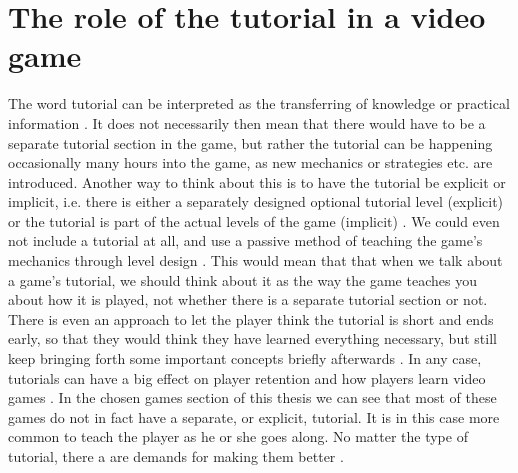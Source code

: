 \section{The role of the tutorial in a video game}

The word tutorial can be interpreted as the transferring of knowledge or practical information \cite{tutorial}. It does not necessarily then mean that there would have to be a separate tutorial section in the game, but rather the tutorial can be happening occasionally many hours into the game, as new mechanics or strategies etc. are introduced. Another way to think about this is to have the tutorial be explicit or implicit, i.e. there is either a separately designed optional tutorial level (explicit) or the tutorial is part of the actual levels of the game (implicit) \cite{Adams2013}. We could even not include a tutorial at all, and use a passive method of teaching the game's mechanics through level design \cite{Moss2017}. This would mean that that when we talk about a game's tutorial, we should think about it as the way the game teaches you about how it is played, not whether there is a separate tutorial section or not. There is even an approach to let the player think the tutorial is short and ends early, so that they would think they have learned everything necessary, but still keep bringing forth some important concepts briefly afterwards \cite{Lee}. In any case, tutorials can have a big effect on player retention and how players learn video games \cite{Andersen2012}. In the chosen games section of this thesis we can see that most of these games do not in fact have a separate, or explicit, tutorial. It is in this case more common to teach the player as he or she goes along. No matter the type of tutorial, there a are demands for making them better \cite{Smith2017}.
